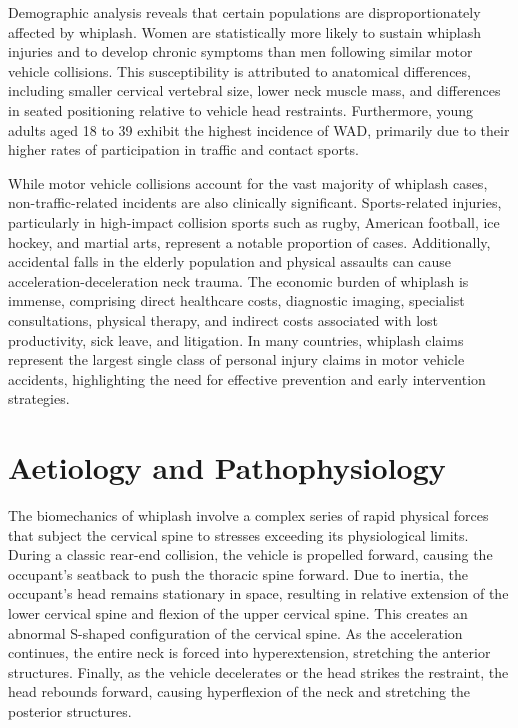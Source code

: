 Demographic analysis reveals that certain populations are disproportionately affected by whiplash. Women are statistically more likely to sustain whiplash injuries and to develop chronic symptoms than men following similar motor vehicle collisions. This susceptibility is attributed to anatomical differences, including smaller cervical vertebral size, lower neck muscle mass, and differences in seated positioning relative to vehicle head restraints. Furthermore, young adults aged 18 to 39 exhibit the highest incidence of WAD, primarily due to their higher rates of participation in traffic and contact sports.

While motor vehicle collisions account for the vast majority of whiplash cases, non-traffic-related incidents are also clinically significant. Sports-related injuries, particularly in high-impact collision sports such as rugby, American football, ice hockey, and martial arts, represent a notable proportion of cases. Additionally, accidental falls in the elderly population and physical assaults can cause acceleration-deceleration neck trauma. The economic burden of whiplash is immense, comprising direct healthcare costs, diagnostic imaging, specialist consultations, physical therapy, and indirect costs associated with lost productivity, sick leave, and litigation. In many countries, whiplash claims represent the largest single class of personal injury claims in motor vehicle accidents, highlighting the need for effective prevention and early intervention strategies.

\section*{Aetiology and Pathophysiology}
The biomechanics of whiplash involve a complex series of rapid physical forces that subject the cervical spine to stresses exceeding its physiological limits. During a classic rear-end collision, the vehicle is propelled forward, causing the occupant's seatback to push the thoracic spine forward. Due to inertia, the occupant's head remains stationary in space, resulting in relative extension of the lower cervical spine and flexion of the upper cervical spine. This creates an abnormal S-shaped configuration of the cervical spine. As the acceleration continues, the entire neck is forced into hyperextension, stretching the anterior structures. Finally, as the vehicle decelerates or the head strikes the restraint, the head rebounds forward, causing hyperflexion of the neck and stretching the posterior structures.

